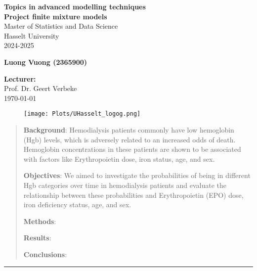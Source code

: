 \documentclass [11pt]{article}
\begin{document}
\clearpage\thispagestyle{empty}

\begin{titlepage}

\begin{center}
\vspace*{1in}
	\centering\textbf{\huge{Topics in advanced modelling techniques\\[1cm]
 	Project finite mixture models
 }} \\[2cm]
	\Large{
	Master of Statistics and Data Science \\
	Hasselt University\\	
        2024-2025 \\
	}


\vspace*{3cm}
\textbf{\large{Luong Vuong (2365900)}}\\


\vspace*{2cm}


\vspace*{1.5cm}
\textbf{\large{Lecturer:}}\\
Prof. Dr. Geert Verbeke \\

\vspace*{2\baselineskip}
\today

\begin{figure}[b]
    \centering
    \texttt{[image: Plots/UHasselt\_logog.png]}
    \label{fig:Uhasselt}
\end{figure}

\end{center}

\end{titlepage}

\newpage \setcounter{page}{1}

\begin{abstract}
\noindent\textbf{Background}:
Hemodialysis patients commonly have low hemoglobin (Hgb) levels, which is adversely related to an increased odds of death. Hemoglobin concentrations in these patients are shown to be associated with factors like Erythropoietin dose, iron status, age, and sex.

\noindent\textbf{Objectives}:
We aimed to investigate the probabilities of being in different Hgb categories over time in hemodialysis patients and evaluate the relationship between these probabilities and Erythropoietin (EPO) dose, iron deficiency status, age, and sex.

\noindent\textbf{Methods}: 


\noindent\textbf{Results}: 


\noindent\textbf{Conclusions}:


 

\end{abstract}
\rule{\textwidth}{0.4pt}
\end{document}
